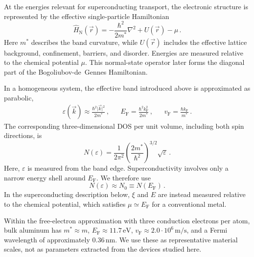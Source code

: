             At the energies relevant for superconducting transport, the electronic structure is represented by the effective single-particle Hamiltonian
            \begin{equation}
                \hat{H}_\mathrm{N}(\vec{r})
                = -\frac{\hbar^2}{2m^\ast}\nabla^2
                + U(\vec{r})-\mu\,.
                \label{eq:quasi:normal-hamiltonian}
            \end{equation}
            Here $m^\ast$ describes the band curvature, while $U(\vec r)$ includes the effective lattice background, confinement, barriers, and disorder. Energies are measured relative to the chemical potential $\mu$. This normal-state operator later forms the diagonal part of the Bogoliubov-de~Gennes Hamiltonian. \cite{gross_festkorperphysik_2014}

            In a homogeneous system, the effective band introduced above is approximated as parabolic,
            \begin{align}
                \varepsilon(\vec{k})
                \approx \frac{\hbar^2 \lvert\vec{k}\rvert^2}{2m^\ast}\,,
                &&
                E_\mathrm{F}
                = \frac{\hbar^2 k_\mathrm{F}^2}{2m^\ast}\,,
                &&
                v_\mathrm{F}
                = \frac{\hbar k_\mathrm{F}}{m^\ast}\,.
                \label{eq:micro:normal-dispersion}
            \end{align}
            The corresponding three-dimensional DOS per unit volume, including both spin directions, is
            \begin{equation}
                N(\varepsilon)
                = \frac{1}{2\pi^2}
                \left(\frac{2m^\ast}{\hbar^2}\right)^{3/2}
                \sqrt{\varepsilon}\,.
                \label{eq:micro:normal-dos}
            \end{equation}
            Here, $\varepsilon$ is measured from the band edge. Superconductivity involves only a narrow energy shell around $E_\mathrm{F}$. We therefore use
            \begin{equation}
                N(\varepsilon) \approx N_0 \equiv N(E_\mathrm{F})\,.
                \label{eq:micro:constant-normal-dos}
            \end{equation}
            In the superconducting description below, $\xi$ and $E$ are instead measured relative to the chemical potential, which satisfies $\mu\simeq E_\mathrm{F}$ for a conventional metal.

            Within the free-electron approximation with three conduction electrons per atom, bulk aluminum has $m^\ast\approx m$, $E_\mathrm{F}\approx11.7\,\mathrm{eV}$, $v_\mathrm{F}\approx2.0\cdot10^6\,\mathrm{m/s}$, and a Fermi wavelength of approximately $0.36\,\mathrm{nm}$. We use these as representative material scales, not as parameters extracted from the devices studied here. \cite{ashcroft_solid_1976}

